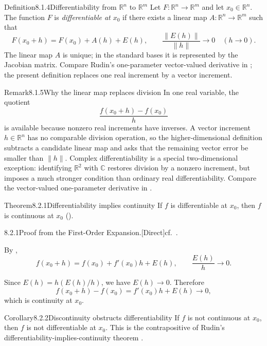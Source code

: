 \documentclass[main.tex]{subfiles}
\begin{document}
\begin{Obj}{Definition}{8.1.4}{Differentiability from $\mathbb R^n$ to $\mathbb R^m$}
Let $F:\mathbb R^n\to\mathbb R^m$ and let $x_0\in\mathbb R^n$. The function $F$ is
\emph{differentiable at $x_0$} if there exists a linear map
$A:\mathbb R^n\to\mathbb R^m$ such that
\[
  F(x_0+h)=F(x_0)+A(h)+E(h),
  \qquad
  \frac{\|E(h)\|}{\|h\|}\longrightarrow0
  \quad(h\to0).
\]
The linear map $A$ is unique; in the standard bases it is represented by the Jacobian matrix.
Compare Rudin's one-parameter vector-valued derivative in ; the present definition
replaces one real increment by a vector increment.
\end{Obj}

\begin{ObjL}{Remark}{8.1.5}{Why the linear map replaces division}
In one real variable, the quotient
\[
  \frac{f(x_0+h)-f(x_0)}{h}
\]
is available because nonzero real increments have inverses. A vector increment
$h\in\mathbb R^n$ has no comparable division operation, so the higher-dimensional definition
subtracts a candidate linear map and asks that the remaining vector error be smaller than
$\|h\|$. Complex differentiability is a special two-dimensional exception: identifying
$\mathbb R^2$ with $\mathbb C$ restores division by a nonzero increment, but imposes a much
stronger condition than ordinary real differentiability. Compare the vector-valued
one-parameter derivative in .
\end{ObjL}


\begin{Obj}{Theorem}{8.2.1}{Differentiability implies continuity}
If $f$ is differentiable at $x_0$, then $f$ is continuous at $x_0$ ().
\end{Obj}

\begin{Prf}{8.2.1}{Proof from the First-Order Expansion.}{[Direct]\quad cf.\ .}
\item By ,
  \[
    f(x_0+h)=f(x_0)+f'(x_0)h+E(h),
    \qquad \frac{E(h)}{h}\to0 .
  \]
\item Since $E(h)=h(E(h)/h)$, we have $E(h)\to0$. Therefore
  \[
    f(x_0+h)-f(x_0)=f'(x_0)h+E(h)\longrightarrow0,
  \]
  which is continuity at $x_0$.
\end{Prf}

\begin{Obj}{Corollary}{8.2.2}{Discontinuity obstructs differentiability}
If $f$ is not continuous at $x_0$, then $f$ is not differentiable at $x_0$.
This is the contrapositive of Rudin's differentiability-implies-continuity theorem .
\end{Obj}
\end{document}
